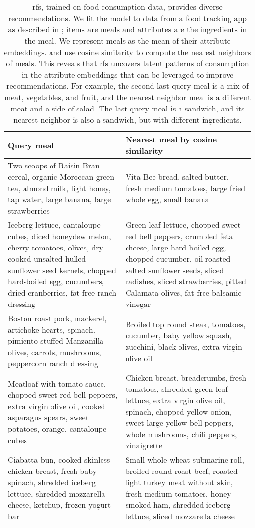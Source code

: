 \begin{table*}[!hbpt]
\centering
\begin{tabular}{p{80mm}|p{80mm}}
  \toprule
  Query meal & Nearest meal by cosine similarity \\
  \midrule
  Two scoops of Raisin Bran cereal, organic Moroccan green tea, almond milk,
  light honey, tap water, large banana, large strawberries
       &
         Vita Bee bread, salted butter, fresh medium tomatoes, large fried whole
         egg, small banana\\\hline
  Iceberg lettuce, cantaloupe cubes, diced honeydew melon, cherry tomatoes, olives, dry-cooked unsalted
  hulled sunflower seed kernels, chopped hard-boiled
  egg, cucumbers, dried cranberries, fat-free ranch dressing
       &
         Green leaf lettuce, chopped sweet red bell peppers, crumbled feta cheese,
         large hard-boiled egg,
         chopped cucumber, oil-roasted salted sunflower seeds, sliced radishes, sliced strawberries, pitted Calamata olives, fat-free
         balsamic vinegar\\\hline
  Boston roast pork, mackerel, artichoke hearts, spinach, pimiento-stuffed
  Manzanilla olives, carrots, mushrooms, peppercorn ranch dressing
       &
         Broiled top
         round steak, tomatoes, cucumber, baby yellow squash, zucchini, black olives,
         extra
         virgin
         olive oil\\\hline
  Meatloaf with tomato sauce, chopped sweet red bell peppers, extra virgin olive oil, cooked asparagus spears, sweet potatoes, orange, cantaloupe cubes
       &
         Chicken breast, breadcrumbs, fresh tomatoes, shredded green leaf
         lettuce, extra virgin olive oil, spinach, chopped yellow onion, sweet
         large yellow bell peppers, whole mushrooms, chili peppers, vinaigrette
  \\\hline
  Ciabatta bun, cooked skinless chicken breast, fresh baby spinach, shredded iceberg lettuce,
  shredded mozzarella cheese, ketchup, frozen yogurt bar
             &
               Small whole wheat submarine roll, broiled round roast
               beef, roasted light turkey meat without skin, fresh medium
               tomatoes, honey smoked ham, shredded iceberg lettuce, sliced mozzarella cheese\\
         \bottomrule
\end{tabular}
\caption{\acrlong{rfs}, trained on food consumption data, provides diverse
  recommendations. We fit the model to data from a food tracking app as
  described in ; items are meals and attributes are
  the ingredients in the meal. We represent meals as the mean of their attribute
  embeddings, and use cosine similarity to compute the nearest neighbors of
  meals. This reveals that \acrlong{rfs} uncovers latent patterns of consumption
  in the attribute embeddings that can be leveraged to improve recommendations.
  For example, the second-last query meal is a mix of meat, vegetables, and
  fruit, and the nearest neighbor meal is a different meat and a side of salad.
  The last query meal is a sandwich, and its nearest neighbor is also a
  sandwich, but with different ingredients.}
\label{tab:nearest_meals}
\end{table*}

